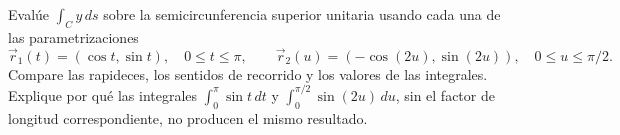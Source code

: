 Evalúe $\int_C y\,ds$ sobre la semicircunferencia superior unitaria usando cada una de las parametrizaciones
\[
\vec r_1(t)=(\cos t,\sin t),\quad 0\leq t\leq\pi,
\qquad
\vec r_2(u)=(-\cos(2u),\sin(2u)),\quad 0\leq u\leq\pi/2.
\]
Compare las rapideces, los sentidos de recorrido y los valores de las integrales. Explique por qué las integrales $\int_0^\pi\sin t\,dt$ y $\int_0^{\pi/2}\sin(2u)\,du$, sin el factor de longitud correspondiente, no producen el mismo resultado.
